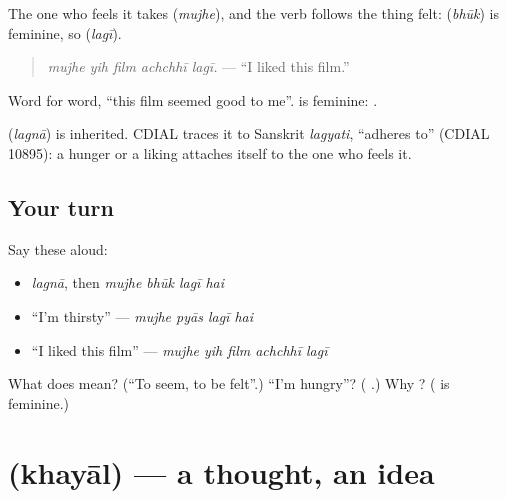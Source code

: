 The one who feels it takes \textbf{} (\emph{mujhe}), and the verb follows the thing felt: \textbf{} (\emph{bhūk}) is feminine, so \textbf{} (\emph{lagī}).

\begin{quote}
\textbf{    }
\end{quote}

\begin{quote}
\emph{mujhe yih film achchhī lagī.} — \textquotedblleft{}I liked this film.\textquotedblright{}
\end{quote}

Word for word, \textquotedblleft{}this film seemed good to me\textquotedblright{}. \textbf{} is feminine: \textbf{ }.

\begin{cousinweb}
\textbf{} (\emph{lagnā}) is inherited. CDIAL traces it to Sanskrit \emph{lagyati}, \textquotedblleft{}adheres to\textquotedblright{} (CDIAL 10895): a hunger or a liking attaches itself to the one who feels it.
\end{cousinweb}

\subsection*{Your turn}
Say these aloud:

\begin{itemize}
\raggedright
  \item \emph{lagnā}, then \emph{mujhe bhūk lagī hai}
  \item \textquotedblleft{}I'm thirsty\textquotedblright{} — \emph{mujhe pyās lagī hai}
  \item \textquotedblleft{}I liked this film\textquotedblright{} — \emph{mujhe yih film achchhī lagī}
\end{itemize}

\begin{tcolorbox}[breakable,colback=teal!4,colframe=teal!35!black,title={Before you move on}]
What does \textbf{} mean? (\textquotedblleft{}To seem, to be felt\textquotedblright{}.) \textquotedblleft{}I'm hungry\textquotedblright{}? (\textbf{   }.) Why \textbf{}? (\textbf{} is feminine.)
\end{tcolorbox}
\section[\texorpdfstring{\ur{خیال} (khayāl)}{خیال (khayāl)}]{ (khayāl) — a thought, an idea}

